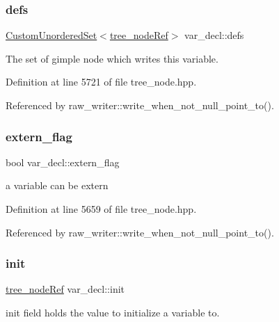 \subsubsection{\texorpdfstring{defs}{defs}}
{\footnotesize\ttfamily \hyperlink{classCustomUnorderedSet}{Custom\+Unordered\+Set}$<$\hyperlink{tree__node_8hpp_a6ee377554d1c4871ad66a337eaa67fd5}{tree\+\_\+node\+Ref}$>$ var\+\_\+decl\+::defs}



The set of gimple node which writes this variable. 



Definition at line 5721 of file tree\+\_\+node.\+hpp.



Referenced by raw\+\_\+writer\+::write\+\_\+when\+\_\+not\+\_\+null\+\_\+point\+\_\+to().

\mbox{\label{structvar__decl_a34146dccb0fce580edb7f412e5984d43}} 
\subsubsection{\texorpdfstring{extern\+\_\+flag}{extern\_flag}}
{\footnotesize\ttfamily bool var\+\_\+decl\+::extern\+\_\+flag}



a variable can be extern 



Definition at line 5659 of file tree\+\_\+node.\+hpp.



Referenced by raw\+\_\+writer\+::write\+\_\+when\+\_\+not\+\_\+null\+\_\+point\+\_\+to().

\mbox{\label{structvar__decl_a2567c8702cd5241fc2ba9fffeb5bb8ca}} 
\subsubsection{\texorpdfstring{init}{init}}
{\footnotesize\ttfamily \hyperlink{tree__node_8hpp_a6ee377554d1c4871ad66a337eaa67fd5}{tree\+\_\+node\+Ref} var\+\_\+decl\+::init}



init field holds the value to initialize a variable to. 

